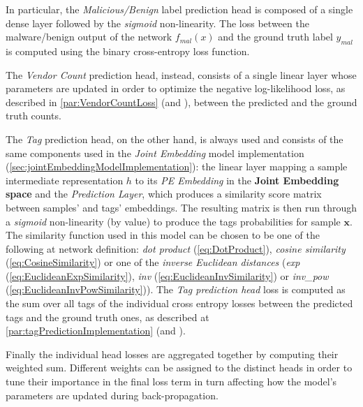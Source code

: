 \documentclass[pdfa%
,cucitura%
]{toptesi}
\begin{document}
In particular, the \textit{Malicious/Benign} label prediction head is composed of a single dense layer followed by the \textit{sigmoid} non-linearity. The loss between the malware/benign output of the network $f_{mal}(x)$ and the ground truth label $y_{mal}$ is computed using the binary cross-entropy loss function.

The \textit{Vendor Count} prediction head, instead, consists of a single linear layer whose parameters are updated in order to optimize the negative log-likelihood loss, as described in \ref{par:VendorCountLoss} (and \cite{ruddALOHA}), between the predicted and the ground truth counts.

The \textit{Tag} prediction head, on the other hand, is always used and consists of the same components used in the \textit{Joint Embedding} model implementation (\ref{sec:jointEmbeddingModelImplementation}): the linear layer mapping a sample intermediate representation $h$ to its \textit{PE Embedding} in the \textbf{Joint Embedding space} and the \textit{Prediction Layer}, which produces a similarity score matrix between samples' and tags' embeddings. The resulting matrix is then run through a \textit{sigmoid} non-linearity (by value) to produce the tags probabilities for sample $\textbf{x}$. The similarity function used in this model can be chosen to be one of the following at network definition: \textit{dot product} (\ref{eq:DotProduct}), \textit{cosine similarity} (\ref{eq:CosineSimilarity}) or one of the \textit{inverse Euclidean distances} (\textit{exp} (\ref{eq:EuclideanExpSimilarity}), \textit{inv} (\ref{eq:EuclideanInvSimilarity}) or \textit{inv\_pow} (\ref{eq:EuclideanInvPowSimilarity})). The \textit{Tag prediction head} loss is computed as the sum over all tags of the individual cross entropy losses between the predicted tags and the ground truth ones, as described at \ref{par:tagPredictionImplementation} (and \cite{DucauAMDATSE}).

Finally the individual head losses are aggregated together by computing their weighted sum. Different weights can be assigned to the distinct heads in order to tune their importance in the final loss term in turn affecting how the model's parameters are updated during back-propagation.
\end{document}
